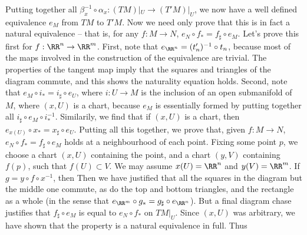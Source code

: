 Putting together all $\beta_x^{-1} \circ \alpha_x: (TM)|_U \to (T'M)|_U$, we now have a well defined equivalence $e_M$ from $TM$ to $T'M$. Now we need only prove that this is in fact a natural equivalence -- that is, for any $f: M \to N$, $e_N \circ f_* = f_\sharp \circ e_M$. Let's prove this first for $f: \RR^n \to \RR^m$. First, note that $e_{\RR^n} = (t_n')^{-1} \circ t_n$, because most of the maps involved in the construction of the equivalence are trivial. The properties of the tangent map imply that the squares and triangles of the diagram
%
%
commute, and this shows the naturality equation holds. Second, note that $e_M \circ i_* = i_\sharp \circ e_U$, where $i: U \to M$ is the inclusion of an open submanifold of $M$, where $(x,U)$ is a chart, because $e_M$ is essentially formed by putting together all $i_\sharp \circ e_M \circ i_*^{-1}$. Similarily, we find that if $(x,U)$ is a chart, then $e_{x(U)} \circ x_* = x_\sharp \circ e_U$. Putting all this together, we prove that, given $f:M \to N$, $e_N \circ f_* = f_\sharp \circ e_M$ holds at a neighbourhood of each point. Fixing some point $p$, we choose a chart $(x,U)$ containing the point, and a chart $(y,V)$ containing $f(p)$, such that $f(U) \subset V$. We may assume $x(U) = \RR^n$ and $y(V) = \RR^m$. If $g = y \circ f \circ x^{-1}$, then
%
%
Then we have justified that all the squares in the diagram but the middle one commute, as do the top and bottom triangles, and the rectangle as a whole (in the sense that $e_{\RR^m} \circ g_* = g_\sharp \circ e_{\RR^n}$). But a final diagram chase justifies that $f_\sharp \circ e_M$ is equal to $e_N \circ f_*$ on $TM|_U$. Since $(x,U)$ was arbitrary, we have shown that the property is a natural equivalence in full. Thus

